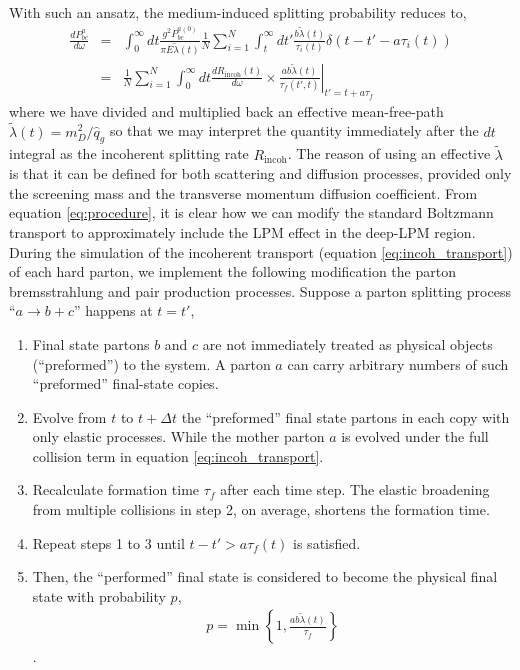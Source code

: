 \documentclass[aps, prc, reprint, amsmath, groupedaddress, nofootinbib]{revtex4-1}
\begin{document}
With such an ansatz, the medium-induced splitting probability reduces to,
\begin{eqnarray}
\nonumber
\frac{dP^{a}_{bc}}{d\omega} &=& \int_0^\infty dt \frac{g^2 P_{bc}^{a(0)}}{\pi E\tilde{\lambda}(t)} \frac{1}{N}\sum_{i=1}^N \int_t^\infty dt' \frac{b \tilde{\lambda}(t)}{\tau_i(t)} \delta(t-t'- a \tau_i(t)) \\
&=& \frac{1}{N}\sum_{i=1}^N\int_0^\infty dt \frac{dR_{\textrm{incoh}}(t)}{d\omega} \times \left.\frac{ab\tilde{\lambda}(t)}{\tau_f(t',t)}\right|_{t'=t+a\tau_f}
\label{eq:procedure}
\end{eqnarray}
where we have divided and multiplied back an effective mean-free-path $\tilde{\lambda}(t) = m_D^2/\hat{q}_g$ so that we may interpret the quantity immediately after the $dt$ integral as the incoherent splitting rate $R_{\textrm{incoh}}$.
The reason of using an effective $\tilde{\lambda}$ is that it can be defined for both scattering and diffusion processes, provided only the screening mass and the transverse momentum diffusion coefficient.
From equation \ref{eq:procedure}, it is clear how we can modify the standard Boltzmann transport to approximately include the LPM effect in the deep-LPM region.
During the simulation of the incoherent transport  (equation \ref{eq:incoh_transport}) of each hard parton, we implement the following modification the parton bremsstrahlung and pair production processes.
Suppose a parton splitting process ``$a\rightarrow b+c$'' happens at $t=t'$,
\begin{enumerate}
\item Final state partons $b$ and $c$ are not immediately treated as physical objects (``preformed'') to the system. A parton $a$ can carry arbitrary numbers of such ``preformed'' final-state copies.
\item Evolve from $t$ to $t+\Delta t$ the ``preformed'' final state partons in each copy with only elastic processes. 
While the mother parton $a$ is evolved under the full collision term in equation \ref{eq:incoh_transport}.
\item Recalculate formation time $\tau_f$ after each time step. 
The elastic broadening from multiple collisions in step 2, on average, shortens the formation time.
\item Repeat steps 1 to 3 until $t-t' > a\tau_f(t)$ is satisfied. 
\item Then, the ``performed'' final state is considered to become the physical final state with probability $p$, 
\begin{eqnarray}
p = \min\left\{1, \frac{ab\tilde{\lambda}(t)}{\tau_f}\right\}
\label{eq:rejection}
\end{eqnarray}.
\end{enumerate}
\end{document}
